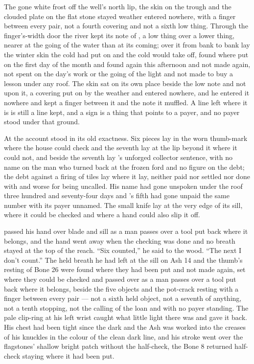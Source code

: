 The gone white frost off the well's north lip, the skin on the trough and the clouded plate on the flat stone stayed weather entered nowhere, with a finger between every pair, not a fourth covering and not a sixth low thing. Through the finger's-width door the river kept its note of , a low thing over a lower thing, nearer at the going of the water than at its coming; over it from bank to bank lay the winter skin the cold had put on and the cold would take off, found where put on the first day of the month and found again this afternoon and not made again, not spent on the day's work or the going of the light and not made to buy a lesson under any roof. The skin sat on its own place beside the low note and not upon it, a covering put on by the weather and entered nowhere, and he entered it nowhere and kept a finger between it and the note it muffled. A line left where it is is still a line kept, and a sign is a thing that points to a payer, and no payer stood under that ground.

\scenebreak

At  the account stood in its old exactness. Six pieces lay in the worn thumb-mark where the house could check and the seventh lay at the lip beyond it where it could not, and beside the seventh lay 's unforged collector sentence, with no name on the man who turned back at the frozen ford and no figure on the debt; the debt against a firing of tiles lay where it lay, neither paid nor settled nor done with and worse for being uncalled. His name had gone unspoken under the roof three hundred and seventy-four days and 's fifth had gone unpaid the same number with its payer unnamed. The small knife lay at the very edge of its sill, where it could be checked and where a hand could also slip it off.

 passed his hand over blade and sill as a man passes over a tool put back where it belongs, and the hand went away when the checking was done and no breath stayed at the top of the reach. “Six counted,” he said to the wood. “The next I don't count.” The held breath he had left at the sill on Ash 14 and the thumb's resting of Bone 26 were found where they had been put and not made again, set where they could be checked and passed over as a man passes over a tool put back where it belongs, beside the five objects and the pot-crack resting with a finger between every pair — not a sixth held object, not a seventh of anything, not a tenth stopping, not the calling of the loan and with no payer standing. The pale clip-ring at his left wrist caught what little light there was and gave it back. His chest had been tight since the dark and the Ash was worked into the creases of his knuckles in the colour of the clean dark line, and his stroke went over the flagstones' shallow bright patch without the half-check, the Bone 8 returned half-check staying where it had been put.

